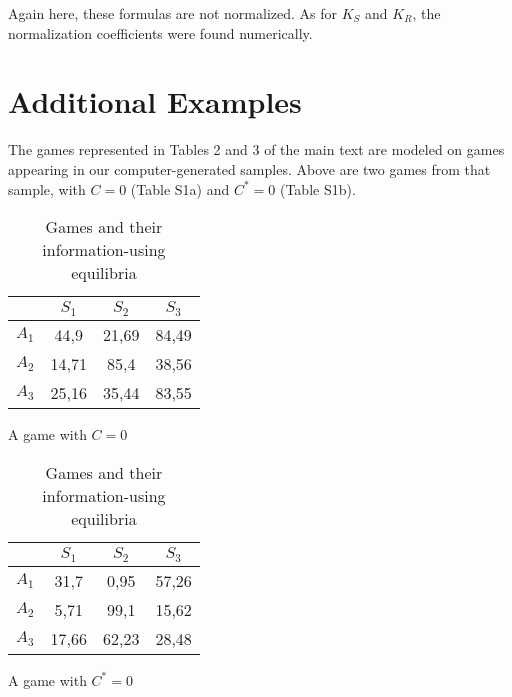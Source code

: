 \documentclass{article}
\begin{document}
Again here, these formulas are not normalized. As for $K_S$ and $K_R$, the normalization coefficients were found numerically.

\section*{Additional Examples}

The games represented in Tables 2 and 3 of the main text are modeled on
games appearing in our computer-generated samples. Above are two
games from that sample, with $C=0$ (Table S1a) and $C^*=0$ (Table S1b).

\begin{table}
    \centering
    \begin{subtable}{.4\textwidth}
        \begin{tabular}{|c||c|c|c|}
        & $S_{1}$ & $S_{2}$ & $S_{3}$ \\
        \hline
        $A_{1}$ & 44,9 & 21,69 & 84,49 \\
        $A_{2}$ & 14,71 & 85,4 & 38,56 \\
        $A_{3}$ & 25,16 & 35,44 & 83,55 \\
        \end{tabular}
        \newline
        \newline
        \caption{A game with $C=0$}
    \end{subtable}
    \begin{subtable}{.4\textwidth}
        \begin{tabular}{|c||c|c|c|}
        & $S_{1}$ & $S_{2}$ & $S_{3}$ \\
        \hline
        $A_{1}$ & 31,7 & 0,95 & 57,26 \\
        $A_{2}$ & 5,71 & 99,1 & 15,62 \\
        $A_{3}$ & 17,66 & 62,23 & 28,48 \\
        \end{tabular}
        \newline
        \newline
        \caption{A game with $C^*=0$}
    \end{subtable}
    \caption{Games and their information-using equilibria}
    \label{tab:label}
\end{table}
\end{document}
